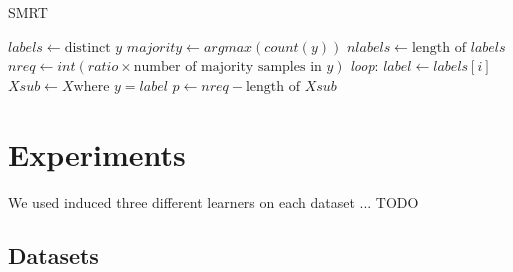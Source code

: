\documentclass[twoside,11pt]{article}
\begin{document}
\begin{algorithm}
\caption{SMRT}\label{smrt}
  \begin{algorithmic}[1]
      \State $labels \gets \text{distinct } \textit{y}$
      \State $majority \gets argmax(count(y))$
      \State $nlabels \gets \text{length of } labels$
      \State $nreq \gets int(ratio \times \text{number of majority samples in } \textit{y})$
      \BState \emph{loop}:
        \State $label \gets labels[i]$
          \State $Xsub \gets X \text{where } y = label$
          \State $p \gets nreq - \text{length of } Xsub$
          \State {}
          \State {}
        \EndIf
      \EndFor
    \EndProcedure
  \end{algorithmic}
\end{algorithm}

\section{Experiments}

We used induced three different learners on each dataset ... TODO

\subsection{Datasets}


\newpage

\end{document}
